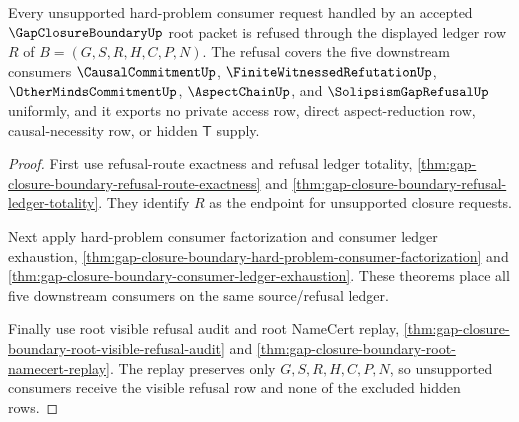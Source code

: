 \begin{theorem}
\label{thm:gap-closure-boundary-consumer-refusal-totality}
Every unsupported hard-problem consumer request handled by an accepted $\GapClosureBoundaryUp$ root packet is refused through the displayed ledger row $R$ of $B=(G,S,R,H,C,P,N)$. The refusal covers the five downstream consumers $\CausalCommitmentUp$, $\FiniteWitnessedRefutationUp$, $\OtherMindsCommitmentUp$, $\AspectChainUp$, and $\SolipsismGapRefusalUp$ uniformly, and it exports no private access row, direct aspect-reduction row, causal-necessity row, or hidden $\mathsf{T}$ supply.
\end{theorem}
\begin{proof}
First use refusal-route exactness and refusal ledger totality, \autoref{thm:gap-closure-boundary-refusal-route-exactness} and \autoref{thm:gap-closure-boundary-refusal-ledger-totality}. They identify $R$ as the endpoint for unsupported closure requests.

Next apply hard-problem consumer factorization and consumer ledger exhaustion, \autoref{thm:gap-closure-boundary-hard-problem-consumer-factorization} and \autoref{thm:gap-closure-boundary-consumer-ledger-exhaustion}. These theorems place all five downstream consumers on the same source/refusal ledger.

Finally use root visible refusal audit and root NameCert replay, \autoref{thm:gap-closure-boundary-root-visible-refusal-audit} and \autoref{thm:gap-closure-boundary-root-namecert-replay}. The replay preserves only $G,S,R,H,C,P,N$, so unsupported consumers receive the visible refusal row and none of the excluded hidden rows.
\end{proof}

